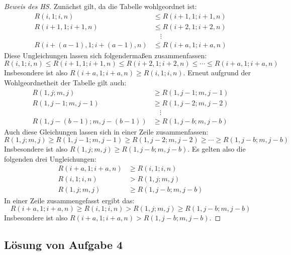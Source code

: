 \begin{proof}[Beweis des HS]
    Zunächst gilt, da die Tabelle wohlgeordnet ist:
    \begin{align*}
        R(i, 1; i, n)&\leq R(i+1, 1; i+1, n)\\
        R(i+1, 1; i+1, n)&\leq R(i+2, 1; i+2, n)\\
        &\quad\vdots\\
        R(i+(a-1), 1; i+(a-1), n)&\leq R(i+a, 1; i+a, n)
    \end{align*}
    Diese Ungleichungen lassen sich folgendermaßen zusammenfassen:
    \[
        R(i, 1; i, n)\leq R(i+1, 1; i+1, n)\leq R(i+2, 1; i+2, n)\leq\cdots\leq R(i+a, 1; i+a, n)
    \]
    Insbesondere ist also $R(i+a, 1; i+a, n)\geq R(i, 1; i, n)$. Erneut aufgrund der Wohlgeordnetheit der Tabelle 
    gilt auch:
    \begin{align*}
        R(1, j; m, j)&\geq R(1, j-1; m, j-1)\\
        R(1, j-1; m, j-1)&\geq R(1, j-2; m, j-2)\\
        &\quad\vdots\\
        R(1, j-(b-1); m, j-(b-1))&\geq R(1, j-b; m, j-b)
    \end{align*}
    Auch diese Gleichungen lassen sich in einer Zeile zusammenfassen:
    \[
        R(1, j; m, j)\geq R(1, j-1; m, j-1)\geq R(1, j-2; m, j-2)\geq\cdots\geq R(1, j-b; m, j-b)
    \]
    Insbesondere ist also $R(1, j; m, j)\geq R(1, j-b; m, j-b)$. Es gelten also die folgenden drei Ungleichungen:
    \begin{align*}
        R(i+a, 1; i+a, n)&\geq R(i, 1; i, n)\\
        R(i, 1; i, n)&>R(1, j; m, j)\\
        R(1, j; m, j)&\geq R(1, j-b; m, j-b)
    \end{align*}
    In einer Zeile zusammengefasst ergibt das:
    \[
        R(i+a, 1; i+a, n)\geq R(i, 1; i, n)>R(1, j; m, j)\geq R(1, j-b; m, j-b)
    \]
    Insbesondere ist also $R(i+a, 1; i+a, n)>R(1, j-b; m, j-b)$.
\end{proof}

\subsection*{Lösung von Aufgabe 4}

